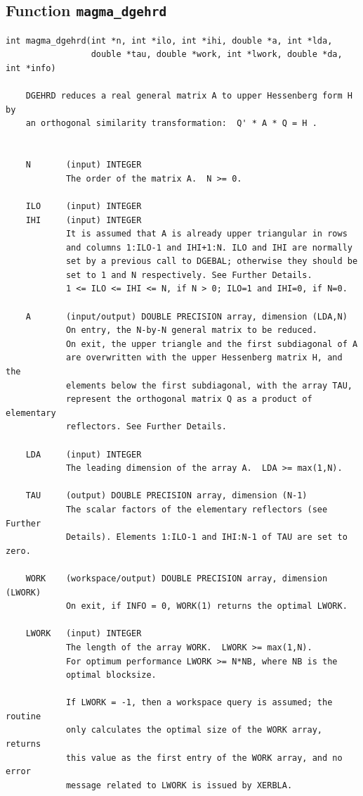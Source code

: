 \documentclass[10pt]{book}
\begin{document}
\subsection{Function {\tt {\bf magma\_dgehrd}}}
\begin{verbatim}
int magma_dgehrd(int *n, int *ilo, int *ihi, double *a, int *lda,
                 double *tau, double *work, int *lwork, double *da, int *info)

    DGEHRD reduces a real general matrix A to upper Hessenberg form H by
    an orthogonal similarity transformation:  Q' * A * Q = H .


    N       (input) INTEGER
            The order of the matrix A.  N >= 0.

    ILO     (input) INTEGER
    IHI     (input) INTEGER
            It is assumed that A is already upper triangular in rows
            and columns 1:ILO-1 and IHI+1:N. ILO and IHI are normally
            set by a previous call to DGEBAL; otherwise they should be
            set to 1 and N respectively. See Further Details.
            1 <= ILO <= IHI <= N, if N > 0; ILO=1 and IHI=0, if N=0.

    A       (input/output) DOUBLE PRECISION array, dimension (LDA,N)
            On entry, the N-by-N general matrix to be reduced.
            On exit, the upper triangle and the first subdiagonal of A
            are overwritten with the upper Hessenberg matrix H, and the
            elements below the first subdiagonal, with the array TAU,
            represent the orthogonal matrix Q as a product of elementary
            reflectors. See Further Details.

    LDA     (input) INTEGER
            The leading dimension of the array A.  LDA >= max(1,N).

    TAU     (output) DOUBLE PRECISION array, dimension (N-1)
            The scalar factors of the elementary reflectors (see Further
            Details). Elements 1:ILO-1 and IHI:N-1 of TAU are set to zero.

    WORK    (workspace/output) DOUBLE PRECISION array, dimension (LWORK)
            On exit, if INFO = 0, WORK(1) returns the optimal LWORK.

    LWORK   (input) INTEGER
            The length of the array WORK.  LWORK >= max(1,N).
            For optimum performance LWORK >= N*NB, where NB is the
            optimal blocksize.

            If LWORK = -1, then a workspace query is assumed; the routine
            only calculates the optimal size of the WORK array, returns
            this value as the first entry of the WORK array, and no error
            message related to LWORK is issued by XERBLA.


\end{verbatim}
\end{document}
